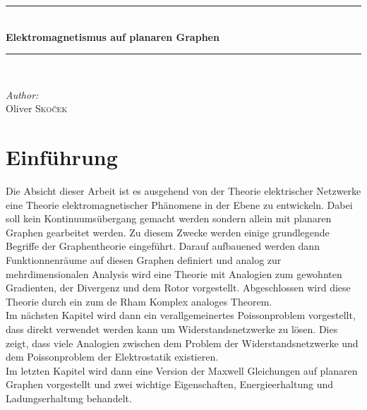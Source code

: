 \documentclass[11pt,a4paper,leqno]{report}
\numberwithin{equation}{chapter}
\renewcommand{\contentsname}{Inhaltsverzeichnis}
\begin{document}
\begin{titlepage}

\vspace*{5cm}
\begin{center}
\rule{\linewidth}{0.5mm} \\[0.4cm]
{ \Huge \bfseries Elektromagnetismus auf planaren Graphen} \\[0.2cm]
\rule{\linewidth}{0.5mm} \\[3.5cm]
\begin{minipage}[t]{0.4\textwidth}
\begin{flushleft} \large
\emph{Author:}\\
Oliver \textsc{Sko\v{c}ek} \\[4cm]
\small

\end{flushleft}

\end{minipage}
\begin{minipage}[t]{0.4\textwidth}

\end{minipage}
 

 
\end{center}
 
\end{titlepage}




\tableofcontents


\vfill


\chapter*{Einf\"uhrung}
Die Absicht dieser Arbeit ist es ausgehend von der Theorie elektrischer Netzwerke eine Theorie elektromagnetischer Ph\"anomene in der Ebene zu entwickeln. Dabei soll kein Kontinuums\"ubergang gemacht werden sondern allein mit planaren Graphen gearbeitet werden. Zu diesem Zwecke werden einige grundlegende Begriffe der Graphentheorie eingef\"uhrt. Darauf aufbauened werden dann Funktionnenr\"aume auf diesen Graphen definiert und analog zur mehrdimensionalen Analysis wird eine Theorie mit Analogien zum gewohnten Gradienten, der Divergenz und dem Rotor vorgestellt. Abgeschlossen wird diese Theorie durch ein zum de Rham Komplex analoges Theorem. \\Im n\"achsten Kapitel wird dann ein verallgemeinertes Poissonproblem vorgestellt, dass direkt verwendet werden kann um Widerstandsnetzwerke zu l\"osen. Dies zeigt, dass viele Analogien zwischen dem Problem der Widerstandsnetzwerke und dem Poissonproblem der Elektrostatik existieren.\\
Im letzten Kapitel wird dann eine Version der Maxwell Gleichungen auf planaren Graphen vorgestellt und zwei wichtige Eigenschaften, Energieerhaltung und Ladungserhaltung behandelt.
\end{document}
